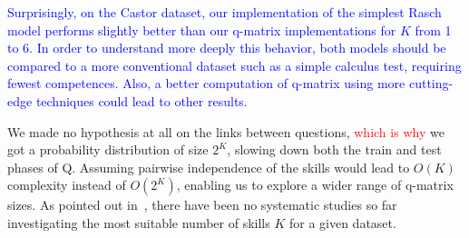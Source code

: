 \documentclass{sig-alternate}
\newcommand\alert[1]{\textcolor{red}{#1}}
\newcommand\note[1]{\textcolor{blue}{#1}}
\begin{document}


\note{Surprisingly, on the Castor dataset, our implementation of the simplest Rasch model performs slightly better than our q-matrix implementations for $K$ from 1 to 6. In order to understand more deeply this behavior, both models should be compared to a more conventional dataset such as a simple calculus test, requiring fewest competences. Also, a better computation of q-matrix using more cutting-edge techniques could lead to other results.} %




We made no hypothesis at all on the links between questions, \alert{which is why} we got a probability distribution of size $2^K$, slowing down both the train and test phases of Q. Assuming pairwise independence of the skills would lead to $O(K)$ complexity instead of $O(2^K)$, enabling us to explore a wider range of q-matrix sizes. As pointed out in~\cite{Huebner2010}, there have been no systematic studies so far investigating the most suitable number of skills $K$ for a given dataset.
\end{document}
